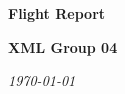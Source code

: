 \documentclass{article}
\begin{document}
        \begin{titlepage}
            \begin{center}
                \vspace*{1cm}
                \Huge
                \textbf{Flight Report}
                    
                \vspace{0.75cm}
                \LARGE
                \textbf{XML Group 04}
                    
                \vspace{0.5cm}
                \LARGE
                \textsl{\today}
            \end{center}
        \end{titlepage}

        \newpage
        
\end{document}
